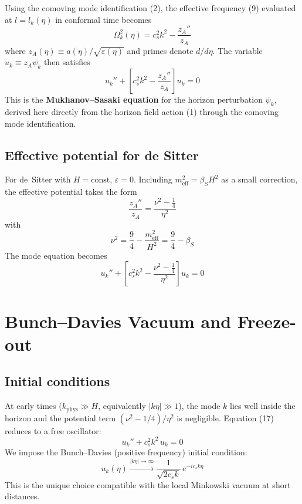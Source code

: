 \documentclass[12pt,a4paper]{article}
\begin{document}
Using the comoving mode identification (2), the effective frequency (9) evaluated at $l = l_k(\eta)$ in conformal time becomes
\begin{equation}
\Omega_k^2(\eta) = c_s^2 k^2 - \frac{z_A''}{z_A} \tag{13}
\end{equation}
where $z_A(\eta) \equiv a(\eta)/\sqrt{\varepsilon(\eta)}$ and primes denote $d/d\eta$. The variable $u_k \equiv z_A \psi_k$ then satisfies
\begin{equation}
u_k'' + \left[c_s^2 k^2 - \frac{z_A''}{z_A}\right]u_k = 0 \tag{14}
\end{equation}
This is the \textbf{Mukhanov--Sasaki equation} for the horizon perturbation $\psi_k$, derived here directly from the horizon field action (1) through the comoving mode identification.

\subsection{Effective potential for de Sitter}

For de~Sitter with $H = \text{const}$, $\varepsilon = 0$. Including $m_\text{eff}^2 = \beta_S H^2$ as a small correction, the effective potential takes the form
\begin{equation}
\frac{z_A''}{z_A} = \frac{\nu^2 - \frac{1}{4}}{\eta^2} \tag{15}
\end{equation}
with
\begin{equation}
\nu^2 = \frac{9}{4} - \frac{m_\text{eff}^2}{H^2} = \frac{9}{4} - \beta_S \tag{16}
\end{equation}
The mode equation becomes
\begin{equation}
u_k'' + \left[c_s^2 k^2 - \frac{\nu^2 - \frac{1}{4}}{\eta^2}\right]u_k = 0 \tag{17}
\end{equation}

\section{Bunch--Davies Vacuum and Freeze-out}

\subsection{Initial conditions}

At early times ($k_\text{phys} \gg H$, equivalently $|k\eta| \gg 1$), the mode $k$ lies well inside the horizon and the potential term $(\nu^2 - 1/4)/\eta^2$ is negligible. Equation (17) reduces to a free oscillator:
\begin{equation}
u_k'' + c_s^2 k^2\, u_k = 0 \tag{18}
\end{equation}
We impose the Bunch--Davies (positive frequency) initial condition:
\begin{equation}
u_k(\eta) \xrightarrow{|k\eta| \to \infty} \frac{1}{\sqrt{2c_s k}}\,e^{-ic_s k\eta} \tag{19}
\end{equation}
This is the unique choice compatible with the local Minkowski vacuum at short distances.
\end{document}
